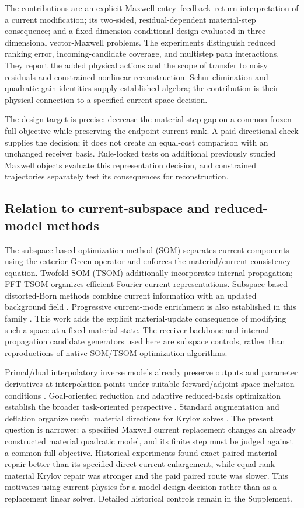 \documentclass[journal]{IEEEtran}
\begin{document}
The contributions are an explicit Maxwell entry--feedback--return interpretation of a current modification; its two-sided, residual-dependent material-step consequence; and a fixed-dimension conditional design evaluated in three-dimensional vector-Maxwell problems. The experiments distinguish reduced ranking error, incoming-candidate coverage, and multistep path interactions. They report the added physical actions and the scope of transfer to noisy residuals and constrained nonlinear reconstruction. Schur elimination and quadratic gain identities supply established algebra; the contribution is their physical connection to a specified current-space decision.

The design target is precise: decrease the material-step gap on a common frozen full objective while preserving the endpoint current rank. A paid directional check supplies the decision; it does not create an equal-cost comparison with an unchanged receiver basis. Rule-locked tests on additional previously studied Maxwell objects evaluate this representation decision, and constrained trajectories separately test its consequences for reconstruction.

\subsection{Relation to current-subspace and reduced-model methods}
The subspace-based optimization method (SOM) separates current components using the exterior Green operator and enforces the material/current consistency equation. Twofold SOM (TSOM) additionally incorporates internal propagation; FFT-TSOM organizes efficient Fourier current representations. Subspace-based distorted-Born methods combine current information with an updated background field \cite{r18,r17,r1,r2,r3,r16}. Progressive current-mode enrichment is also established in this family \cite{r3,r19}. This work adds the explicit material-update consequence of modifying such a space at a fixed material state. The receiver backbone and internal-propagation candidate generators used here are subspace controls, rather than reproductions of native SOM/TSOM optimization algorithms.

Primal/dual interpolatory inverse models already preserve outputs and parameter derivatives at interpolation points under suitable forward/adjoint space-inclusion conditions \cite{r4}. Goal-oriented reduction and adaptive reduced-basis optimization establish the broader task-oriented perspective \cite{r5,r6}. Standard augmentation and deflation organize useful material directions for Krylov solves \cite{r8}. The present question is narrower: a specified Maxwell current replacement changes an already constructed material quadratic model, and its finite step must be judged against a common full objective. Historical experiments found exact paired material repair better than its specified direct current enlargement, while equal-rank material Krylov repair was stronger and the paid paired route was slower. This motivates using current physics for a model-design decision rather than as a replacement linear solver. Detailed historical controls remain in the Supplement.
\end{document}
